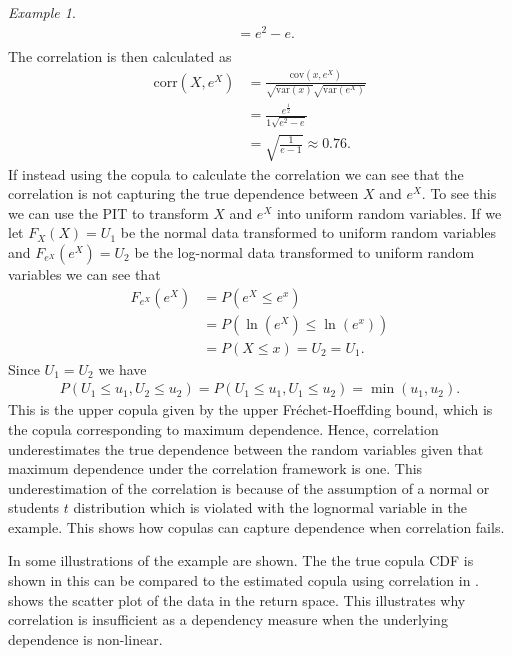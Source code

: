 \documentclass[%
a4paper,							
11pt,								
bibliography=totoc,						
abstracton=true					
]
{scrartcl}
\theoremstyle{plain}
\theoremstyle{definition}
\theoremstyle{remark}
\newtheorem{example}[theorem]{Example}
\newcommand{\1}{\mathbbm{1}}
\begin{document}
\begin{example}
\begin{align*}
        &= e^2 - e.\\
    \end{align*}
    The correlation is then calculated as
    \begin{align*}
        \mathrm{corr}(X,e^X) &= \frac{\mathrm{cov}(x,e^X)}{\sqrt{\mathrm{var}(x)} \sqrt{\mathrm{var}(e^X)}}\\
        & = \frac{e^{\frac{1}{2}}}{1\sqrt{e^2-e}}\\
        &=\sqrt{\frac{1}{e-1}} \approx 0.76. 
    \end{align*}
    If instead using the copula to calculate the correlation we can see that the correlation is not capturing the true dependence between $X$ and $e^X$. To see this we can use the \gls{PIT} to transform $X$ and $e^X$ into uniform random variables. If we let $F_X(X)=U_1$ be the normal data transformed to uniform random variables and $F_{e^X}(e^X)=U_2$ be the log-normal data transformed to uniform random variables we can see that 
    \begin{align*}
        F_{e^X}(e^X) &= P(e^X \leq e^x)\\
        &= P(\ln(e^X) \leq \ln (e^x))\\
        &=P(X\leq x) = U_2 = U_1.
    \end{align*}
    Since $U_1 = U_2$ we have 
    \begin{align*}
        P(U_1\leq u_1, U_2\leq u_2) = P(U_1\leq u_1, U_1\leq u_2) = \min(u_1,u_2).
    \end{align*}
    This is the upper copula given by the upper Fréchet-Hoeffding bound, which is the copula corresponding to maximum dependence. Hence, correlation underestimates the true dependence between the random variables given that maximum dependence under the correlation framework is one. This underestimation of the correlation is because of the assumption of a normal or students $t$ distribution which is violated with the lognormal variable in the example. This shows how copulas can capture dependence when correlation fails.

    In  some illustrations of the example are shown. The the true copula \gls{CDF} is shown in  this can be compared to the estimated copula using correlation in . %
     shows the scatter plot of the data in the return space. This illustrates why correlation is insufficient as a dependency measure when the underlying dependence is non-linear. 
    

\end{example}
\end{document}
